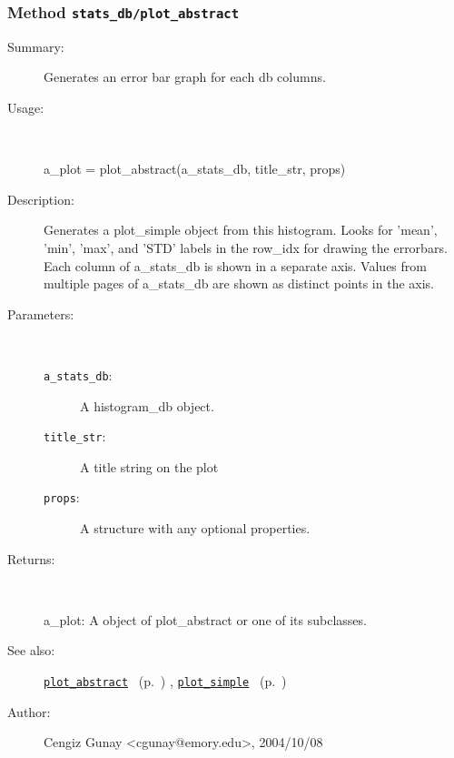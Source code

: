 \subsubsection[Method \texttt{plot\_abstract}]{Method \texttt{stats\_db/plot\_abstract}}%
%
\label{ref_stats_db__plot_abstract}%
\hypertarget{ref_stats_db__plot_abstract}{}%
\begin{description}
\item[Summary:]Generates an error bar graph for each db columns. 
%
\item[Usage:]~%
\begin{lyxcode}%
a\_plot = plot\_abstract(a\_stats\_db, title\_str, props)
%
\end{lyxcode}%
%
\item[Description:]%
Generates a plot\_simple object from this histogram. Looks for 'mean',
 'min', 'max', and 'STD' labels in the row\_idx for drawing the
 errorbars. Each column of a\_stats\_db is shown in a separate
 axis. Values from multiple pages of a\_stats\_db are shown as distinct
 points in the axis.
\item[Parameters:]~
\begin{description}%
\item[\texttt{a\_stats\_db}:]
 A histogram\_db object.
\item[\texttt{title\_str}:]
 A title string on the plot
\item[\texttt{props}:]
 A structure with any optional properties.
\end{description}%
%
\item[Returns:
]~

	a\_plot: A object of plot\_abstract or one of its subclasses.
%
%
\item[See also:]%
\hyperlink{ref_plot_abstract}{\texttt{plot\_abstract}}%
\ (p.~\pageref{ref_plot_abstract})%
%
, \hyperlink{ref_plot_simple}{\texttt{plot\_simple}}%
\ (p.~\pageref{ref_plot_simple})%
%
%
\item[Author:]%
Cengiz Gunay <cgunay@emory.edu>, 2004/10/08
%
\end{description}
\methodline%
